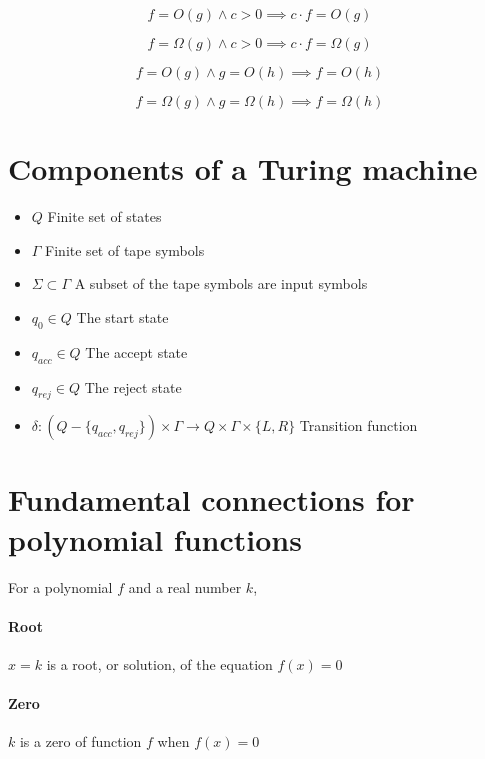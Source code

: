 \documentclass[a4paper]{article}
\begin{document}
    \begin{equation*}
      f = O(g) \land c > 0 \implies c \cdot f = O (g)
    \end{equation*}
    
    \begin{equation*}
      f = \Omega (g) \land c > 0 \implies c \cdot f = \Omega(g)
    \end{equation*}
    
    \begin{equation*}
      f = O(g) \land g = O(h) \implies f = O(h)
    \end{equation*}
    
    \begin{equation*}
      f = \Omega (g) \land g = \Omega(h) \implies f = \Omega(h)
    \end{equation*}
\pagebreak

\section{Components of a Turing machine}
\begin{itemize}
  \item $Q$ Finite set of states
  \item $\Gamma$ Finite set of tape symbols
  \item $\Sigma \subset \Gamma$ A subset of the tape symbols are input symbols
  \item $q_0 \in Q$ The start state
  \item $q_{acc} \in Q$ The accept state
  \item $q_{rej} \in Q$ The reject state
  \item $\delta: (Q - \{q_{acc}, q_{rej}\}) \times \Gamma \to Q \times \Gamma \times \{L, R\}$ Transition function
\end{itemize}

\section{Fundamental connections for polynomial functions}
For a polynomial $f$ and a real number $k$,
\paragraph{Root} $x = k$ is a root, or solution, of the equation $f(x) = 0$
\paragraph{Zero} $k$ is a zero of function $f$ when $f(x) = 0$
\end{document}
